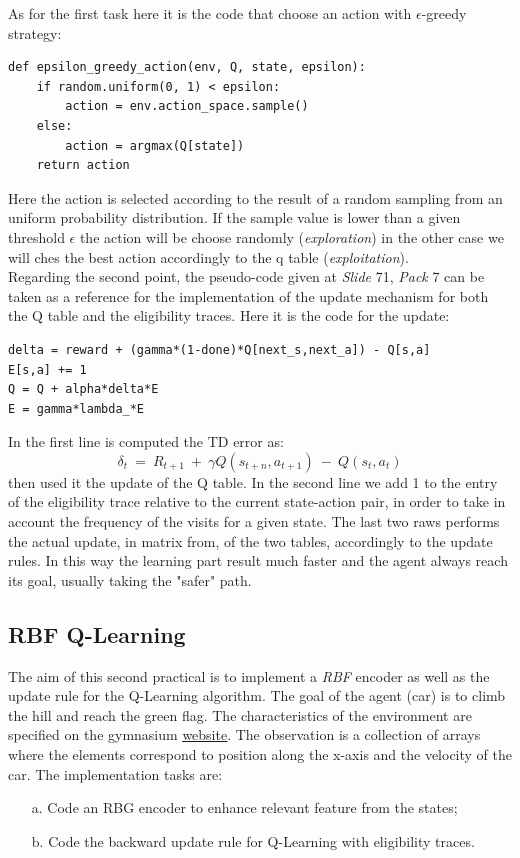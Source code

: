 \documentclass[10pt,a4paper]{article}
\begin{document}
\noindent As for the first task here it is the code that choose an action with $\epsilon$-greedy strategy:
\begin{lstlisting}
def epsilon_greedy_action(env, Q, state, epsilon):
    if random.uniform(0, 1) < epsilon:
        action = env.action_space.sample()  
    else:
        action = argmax(Q[state])
    return action
\end{lstlisting}
\vspace{5pt}

\noindent Here the action is selected according to the result of a random sampling from an uniform probability distribution. If the sample value is lower than a given threshold $\epsilon$ the action will be choose randomly (\textit{exploration}) in the other case we will ches the best action accordingly to the q table (\textit{exploitation}).\\

\noindent Regarding the second point, the pseudo-code given at \textit{Slide} 71, \textit{Pack} 7 can be taken as a reference for the implementation of the update mechanism for both the Q table and the eligibility traces. Here it is the code for the update:
\begin{lstlisting}
delta = reward + (gamma*(1-done)*Q[next_s,next_a]) - Q[s,a]
E[s,a] += 1
Q = Q + alpha*delta*E
E = gamma*lambda_*E
\end{lstlisting}
In the first line is computed the TD error as: 
\begin{equation}
    \delta_t  \:=\: R_{t+1} \:+\: \gamma Q(s_{t+n}, a_{t+1}) \:-\: Q(s_t, a_t)
\end{equation}
then used it the update of the Q table. In the second line we add 1 to the entry of the eligibility trace relative to the current state-action pair, in order to take in account the frequency of the visits for a given state. The last two raws performs the actual update, in matrix from, of the two tables, accordingly to the update rules. In this way the learning part result much faster and the agent always reach its goal, usually taking the "safer" path.
\newpage
\subsection{RBF Q-Learning}
The aim of this second practical is to implement a \textit{RBF} encoder as well as the update rule for the Q-Learning algorithm. The goal of the agent (car) is to climb the hill and reach the green flag. The characteristics of the environment are specified on the gymnasium \href{https://gymnasium.farama.org/environments/classic_control/mountain_car/}{\underline{website}}. The observation is a collection of arrays where the elements correspond to position  along the x-axis and the velocity of the car.
 The implementation tasks are:
\begin{itemize}
    \item[a.] Code an RBG encoder to enhance relevant feature from the states;
    \item[b.] Code the backward update rule for Q-Learning with eligibility traces.
\end{itemize}
\end{document}

